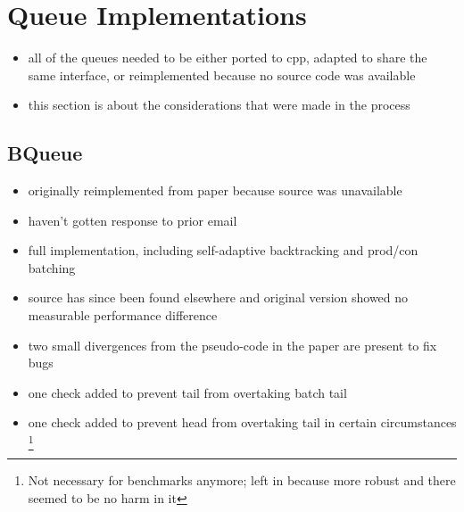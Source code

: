 \section{Queue Implementations}
\begin{itemize}
    \item all of the queues needed to be either ported to cpp, adapted to share the same interface, or
        reimplemented because no source code was available
    \item this section is about the considerations that were made in the process
\end{itemize}

\subsection{BQueue}
\begin{itemize}
    \item originally reimplemented from paper because source was unavailable
    \item haven't gotten response to prior email
    \item full implementation, including self-adaptive backtracking and prod/con batching
    \item source has since been found elsewhere and original version showed no measurable performance difference
    \item two small divergences from the pseudo-code in the paper are present to fix bugs
    \item one check added to prevent tail from overtaking batch tail
    \item one check added to prevent head from overtaking tail in certain circumstances
        \footnote{Not necessary for benchmarks anymore; left in because more robust and there seemed to be no
        harm in it}
\end{itemize}

